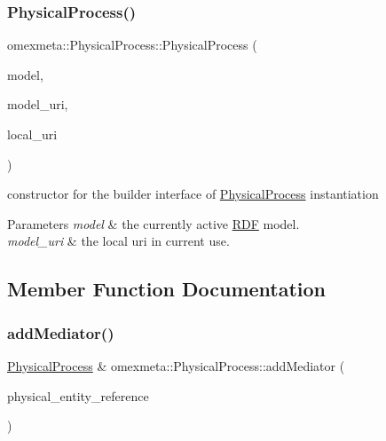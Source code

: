 \subsubsection{\texorpdfstring{Physical\+Process()}{PhysicalProcess()}\hspace{0.1cm}{\footnotesize\ttfamily [4/4]}}
{\footnotesize\ttfamily omexmeta\+::\+Physical\+Process\+::\+Physical\+Process (\begin{DoxyParamCaption}\item[{librdf\+\_\+model $\ast$}]{model,  }\item[{std\+::string}]{model\+\_\+uri,  }\item[{std\+::string}]{local\+\_\+uri }\end{DoxyParamCaption})\hspace{0.3cm}{\ttfamily [explicit]}}



constructor for the builder interface of \hyperlink{classomexmeta_1_1PhysicalProcess}{Physical\+Process} instantiation 


\begin{DoxyParams}{Parameters}
{\em model} & the currently active \hyperlink{classomexmeta_1_1RDF}{R\+DF} model. \\
\hline
{\em model\+\_\+uri} & the local uri in current use. \\
\hline
\end{DoxyParams}


\subsection{Member Function Documentation}
\mbox{\label{classomexmeta_1_1PhysicalProcess_a2bdf8dde5ffa6b38d5042db49fd211d1}} 
\subsubsection{\texorpdfstring{add\+Mediator()}{addMediator()}}
{\footnotesize\ttfamily \hyperlink{classomexmeta_1_1PhysicalProcess}{Physical\+Process} \& omexmeta\+::\+Physical\+Process\+::add\+Mediator (\begin{DoxyParamCaption}\item[{std\+::string}]{physical\+\_\+entity\+\_\+reference }\end{DoxyParamCaption})}



